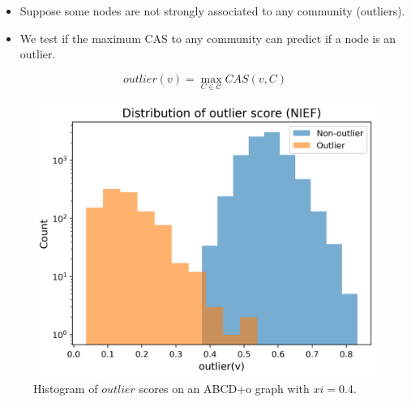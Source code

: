 \documentclass{beamer}
\begin{document}
\begin{frame}{}
    \begin{itemize}
        \color{darkblue}
        \item Suppose some nodes are not strongly associated to any community (outliers).
        \item We test if the maximum CAS to any community can predict if a node is an outlier.
    \end{itemize}
    $$outlier(v) = \max_{C\in \mathcal{C}} CAS(v,C)$$
\end{frame}
\begin{frame}{}
    \begin{figure}
        \includegraphics[height=0.75\textheight]{figures/outlier_hist_0.4.png}
        \caption{Histogram of $outlier$ scores on an ABCD+o graph with $xi=0.4$.}
    \end{figure}
\end{frame}
\end{document}
